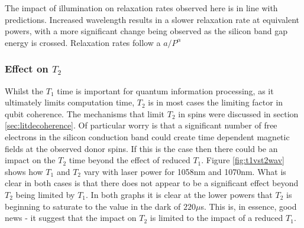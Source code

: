 The impact of illumination on relaxation rates observed here is in line with predictions.
Increased wavelength results in a slower relaxation rate at equivalent powers, with a more significant change being observed as the silicon band gap energy is crossed.
Relaxation rates follow a $a/P^{\alpha}$

\subsubsection{Effect on $T_2$}

Whilst the $T_1$ time is important for quantum information processing, as it ultimately limits computation time, $T_2$ is in most cases the limiting factor in qubit coherence.
The mechanisms that limit $T_2$ in spins were discussed in section \ref{sec:litdecoherence}.
Of particular worry is that a significant number of free electrons in the silicon conduction band could create time dependent magnetic fields at the observed donor spins. 
If this is the case then there could be an impact on the $T_2$ time beyond the effect of reduced $T_1$.
Figure \ref{fig:t1vst2wav} shows how $T_1$ and $T_2$ vary with laser power for 1058nm and 1070nm.
What is clear in both cases is that there does not appear to be a significant effect beyond $T_2$ being limited by $T_1$.
In both graphs it is clear at the lower powers that $T_2$ is beginning to saturate to the value in the dark of $220\mu$s.
This is, in essence, good news - it suggest that the impact on $T_2$ is limited to the impact of a reduced $T_1$.


